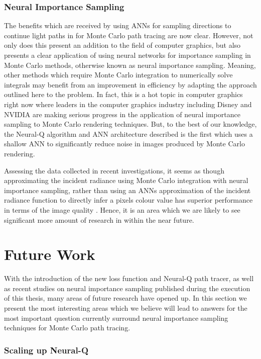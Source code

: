 \documentclass[../dissertation.tex]{subfiles}
\begin{document}
\subsubsection*{Neural Importance Sampling}
The benefits which are received by using ANNs for sampling directions to continue light paths in for Monte Carlo path tracing are now clear. However, not only does this present an addition to the field of computer graphics, but also presents a clear application of using neural networks for importance sampling in Monte Carlo methods, otherwise known as neural importance sampling. Meaning, other methods which require Monte Carlo integration to numerically solve integrals may benefit from an improvement in efficiency by adapting the approach outlined here to the problem. In fact, this is a hot topic in computer graphics right now where leaders in the computer graphics industry including Disney and NVIDIA are making serious progress in the application of neural importance sampling to Monte Carlo rendering techniques. But, to the best of our knowledge, the Neural-Q algorithm and ANN architecture described is the first which uses a shallow ANN to significantly reduce noise in images produced by Monte Carlo rendering.

Assessing the data collected in recent investigations, it seems as though approximating the incident radiance using Monte Carlo integration with neural importance sampling, rather than using an ANNs approximation of the incident radiance function to directly infer a pixels colour value has superior performance in terms of the image quality \cite{}. Hence, it is an area which we are likely to see significant more amount of research in within the near future.

\section{Future Work}

With the introduction of the new loss function and Neural-Q path tracer, as well as recent studies on neural importance sampling published during the execution of this thesis, many areas of future research have opened up. In this section we present the most interesting areas which we believe will lead to answers for the most important question currently surround neural importance sampling techniques for Monte Carlo path tracing. 

\subsubsection{Scaling up Neural-Q}
\end{document}
